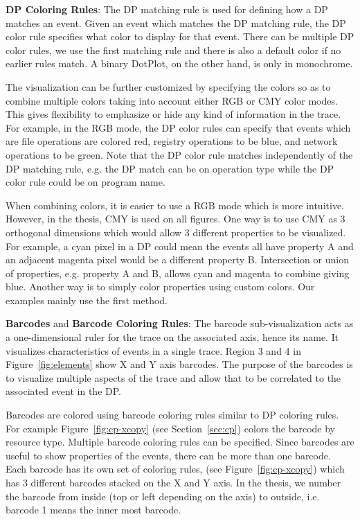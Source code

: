 {\bf DP Coloring Rules}:
The DP matching rule is used for defining how a DP matches
an event. Given an event which matches the DP matching rule,
the DP color rule specifies what color to display for that event.
There can be multiple DP color rules, we use the first matching
rule and there is also a default color if no earlier rules match.
A binary DotPlot, on the other hand, is only in monochrome.

The visualization can be further customized by specifying the colors so
as to combine multiple colors taking
into account either RGB or CMY color modes.
This gives flexibility to emphasize or hide any kind of information
in the trace.
For example, in the RGB mode, the DP color rules
can specify that events which are
file operations are colored red,
registry operations to be blue, and network operations to be green.
Note that the DP color rule matches independently of the DP matching rule,
e.g. the DP match can be on operation type while the DP color rule could be
on program name.

When combining colors, it is easier to use a RGB mode which is
more intuitive. However, in the thesis, CMY is used on all figures.
One way is to use CMY as 3 orthogonal dimensions which would allow 3 different
properties to be visualized.
For example, a cyan pixel in a DP could mean
the events all have property A and an adjacent magenta pixel
would be a different property B.
Intersection or union of properties, e.g. property A and B,
allows cyan and magenta to combine giving blue.
Another way is to simply color properties using custom colors.
Our examples mainly use the first method.

{\bf Barcodes} and {\bf Barcode Coloring Rules}:
The barcode sub-visualization acts as a one-dimensional ruler for the trace on
the associated axis, hence its name.
It visualizes characteristics of events in a single trace.
Region 3 and 4 in Figure~\ref{fig:elements} show X and Y axis barcodes.
The purpose of the barcodes is to visualize multiple aspects of
the trace and allow that to be correlated to the associated event in the DP.

Barcodes are colored using
barcode coloring rules similar to DP coloring rules.
For example Figure~\ref{fig:cp-xcopy} (see Section~\ref{sec:cp})
colors the barcode by resource type.
Multiple barcode coloring rules can be specified.
Since barcodes are useful to show properties of the events,
there can be more than one barcode. Each barcode has its own
set of coloring rules, (see Figure~\ref{fig:cp-xcopy}) which has 3 different
barcodes stacked on the X and Y axis.
In the thesis, we number the barcode from inside (top or left depending
on the axis) to outside, i.e. barcode 1 means the inner most barcode.

